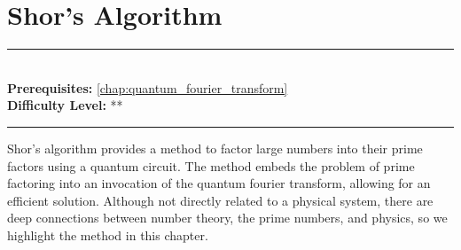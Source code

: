 \documentclass[book.tex]{subfiles}
\begin{document}
\chapter{Shor's Algorithm}
\label{chap:shors_algorithm}
\noindent\rule{11cm}{0.4pt} \\
\textbf{Prerequisites:} \autoref{chap:quantum_fourier_transform} \\
\textbf{Difficulty Level:} ** \\
\noindent\rule{11cm}{0.4pt}
\vspace{5mm}


Shor's algorithm provides a method to factor large numbers into their prime factors using a quantum circuit. The method embeds the problem of prime factoring into an invocation of the quantum fourier transform, allowing for an efficient solution. Although not directly related to a physical system, there are deep connections between number theory, the prime numbers, and physics, so we highlight the method in this chapter. 
\end{document}

